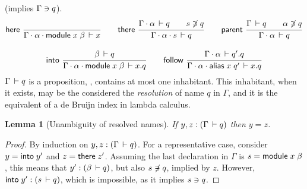 \documentclass{article}
\theoremstyle{definition}
\theoremstyle{plain}
\newtheorem{lemma}{Lemma}
\theoremstyle{remark}
\begin{document}
 (implies $\Gamma\ni q$).
\begin{gather*}
  \nru{\rhere
     }{
     }{\Declares {\Gamma \sep \alpha \sep \mdef x \beta} x}
\qquad
   \nru{\rthere
      }{\Declares {\Gamma \sep \alpha} q \qquad \NotContains s q
      }{\Declares {\Gamma \sep \alpha \sep s} q}
\qquad
   \nru{\rparent
      }{\Declares {\Gamma} q \qquad \NotContains \alpha q
      }{\Declares {\Gamma \sep \alpha} q}
\\[2ex]
  \nru{\rinto
     }{\Declares \beta q
     }{\Declares {\Gamma \sep \alpha \sep \mdef x \beta} {x.q}}
\qquad
  \nru{\rfollow
     }{\Declares {\Gamma \sep \alpha} {q'.q}
     }{\Declares {\Gamma \sep \alpha \sep \malias x q'} {x.q}}
\end{gather*}
$\Gamma\,\vdash q$ is a proposition, \ie, contains at most one
inhabitant.  This inhabitant, when it exists, may be the considered
the \emph{resolution} of name $q$ in $\Gamma$, and it is the
equivalent of a de Bruijn index in lambda calculus.
\begin{lemma}[Unambiguity of resolved names]
  If $y,z : (\Gamma\,\vdash q)$ then $y = z$.
\end{lemma}
\begin{proof}
  By induction on $y,z : (\Gamma\,\vdash q)$.
  For a representative case, consider
  $y = \mathsf{into}\;y'$ and $z = \mathsf{there}\;z'$.
  Assuming the last declaration in $\Gamma$ is $s = \mathsf{module}\;x\;\beta$,
  this means that $y' : (\beta\,\vdash q)$,
  but also $s\not\owns q$, implied by $z$.  However,
  $\mathsf{into}\;y' : (s\,\vdash q)$, which is impossible, as it implies
  $s\ni q$.
\end{proof}
\end{document}
